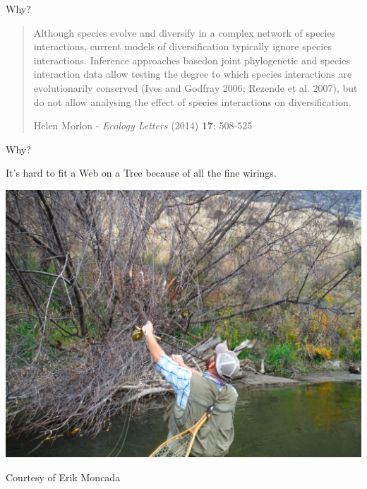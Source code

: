 \documentclass[]{beamer}
\begin{document}
\begin{frame}{Why?}


\begin{quote}
Although species evolve and diversify in a complex network of species interactions, current models of diversification typically ignore species interactions. Inference approaches basedon joint phylogenetic and species interaction data allow testing the degree to which species interactions are evolutionarily conserved (Ives and Godfray 2006; Rezende et al. 2007), but do not allow analysing the effect of species interactions on diversification.

Helen Morlon - \textit{Ecology Letters} (2014) \textbf{17}: 508-525
\end{quote}

\end{frame}

\begin{frame}{Why?}

\centering
It's hard to fit a Web on a Tree because of all the fine wirings.

\centering
\includegraphics[height=0.5 \textheight]{images/finewirings.jpg}

\centering
{\tiny Courtesy of Erik Moncada}

\end{frame}
\end{document}
